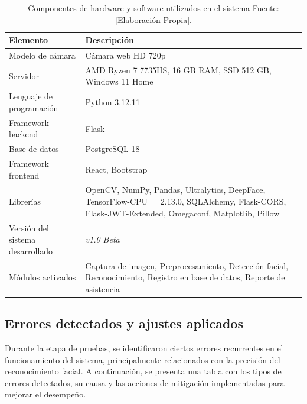 \begin{table}[H]
    \centering
    \caption{Componentes de hardware y software utilizados en el sistema Fuente: [Elaboración Propia].}
    \label{tab:entorno_pruebas}
    \renewcommand{\arraystretch}{1.3}
    \begin{tabular}{|p{4cm}|p{8.7cm}|}
        \hline
        \textbf{Elemento} & \textbf{Descripción} \\ \hline

        Modelo de cámara & Cámara web HD 720p \\ \hline

        Servidor & AMD Ryzen 7 7735HS, 16 GB RAM, SSD 512 GB, Windows 11 Home \\ \hline

        Lenguaje de programación & Python 3.12.11 \\ \hline

        Framework backend & Flask \\ \hline

        Base de datos & PostgreSQL 18 \\ \hline

        Framework frontend & React, Bootstrap \\ \hline

        Librerías & OpenCV, NumPy, Pandas, Ultralytics, DeepFace, TensorFlow-CPU==2.13.0, SQLAlchemy, Flask-CORS, Flask-JWT-Extended, Omegaconf, Matplotlib, Pillow \\ \hline

        Versión del sistema desarrollado & \textit{v1.0 Beta} \\ \hline

        Módulos activados & Captura de imagen, Preprocesamiento, Detección facial, Reconocimiento, Registro en base de datos, Reporte de asistencia \\ \hline
    \end{tabular}
\end{table}

\subsection{Errores detectados y ajustes aplicados}

Durante la etapa de pruebas, se identificaron ciertos errores recurrentes en el funcionamiento del sistema, principalmente relacionados con la precisión del reconocimiento facial. A continuación, se presenta una tabla con los tipos de errores detectados, su causa y las acciones de mitigación implementadas para mejorar el desempeño.

